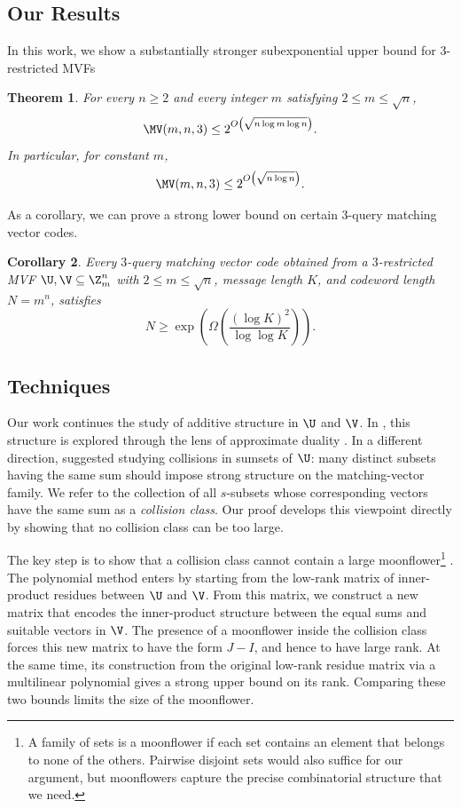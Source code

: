 \documentclass[11pt]{article}
\newtheorem{maintheorem}{Theorem}
\newtheorem{corollary}[maintheorem]{Corollary}
\theoremstyle{definition}
\begin{document}
\subsection{Our Results}

In this work, we show a substantially stronger subexponential upper bound for $3$-restricted MVFs
\begin{maintheorem}\label{thm:mvf-upper}
For every $n\ge 2$ and every integer $m$ satisfying $2\le m\le \sqrt n$,
\[
\MV(m,n,3)
\le
2^{O\left(\sqrt{n\log m\log n}\right)}.
\]
In particular, for constant $m$,
\[
\MV(m,n,3)
\le
2^{O\left(\sqrt{n\log n}\right)}.
\]
\end{maintheorem}

As a corollary, we can prove a strong lower bound on certain $3$-query matching vector codes. 

\begin{corollary}\label{cor:mvc-lower}
Every $3$-query matching vector code obtained from a $3$-restricted MVF
$\U,\V\subseteq \Z_m^n$ with $2\le m\le \sqrt n$, message length $K$, and
codeword length $N=m^n$, satisfies
\[
N
\ge
\exp\left(\Omega\left(\frac{(\log K)^2}{\log\log K}\right)\right).
\]
\end{corollary}

\subsection{Techniques} 

Our work continues the study of additive structure in $\U$ and $\V$. In \cite{bdl13}, this structure is explored through the lens of
approximate duality \cite{zewi}. In a different direction, \cite{aggarwal2025}
suggested studying collisions in sumsets of $\U$: many distinct subsets having
the same sum should impose strong structure on the matching-vector family. We
refer to the collection of all $s$-subsets whose corresponding vectors have the
same sum as a \emph{collision class}. Our proof develops this viewpoint directly
by showing that no collision class can be too large.

The key step is to show that a collision class cannot contain a large
moonflower\footnote{A family of sets is a moonflower if each set contains an
element that belongs to none of the others. Pairwise disjoint sets would also
suffice for our argument, but moonflowers capture the precise combinatorial
structure that we need.} \cite{lovett2026}. The polynomial method enters by
starting from the low-rank matrix of inner-product residues between $\U$ and
$\V$. From this matrix, we construct a new matrix that encodes the
inner-product structure between the equal sums and suitable vectors in $\V$.
The presence of a moonflower inside the collision class forces this new matrix
to have the form $J-I$, and hence to have large rank. At the same time, its
construction from the original low-rank residue matrix via a multilinear
polynomial gives a strong upper bound on its rank. Comparing these two bounds
limits the size of the moonflower.
\end{document}
